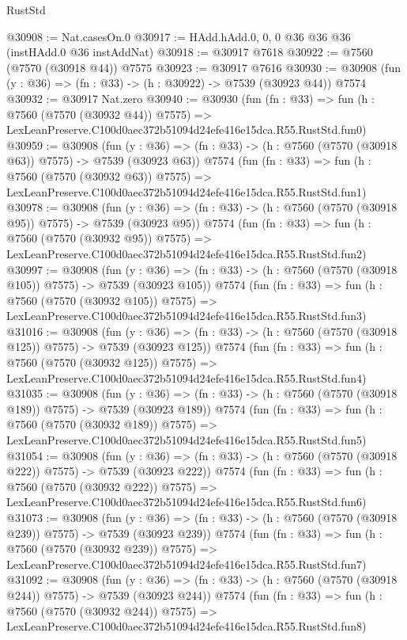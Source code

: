 \begin{lexlean}{RustStd}
\begin{coremodule}
@30908 := Nat.casesOn.{0}
@30917 := HAdd.hAdd.{0, 0, 0} @36 @36 @36 (instHAdd.{0} @36 instAddNat)
@30918 := @30917 @7618
@30922 := @7560 (@7570 (@30918 @44)) @7575
@30923 := @30917 @7616
@30930 := @30908 (fun (y : @36) => (fn : @33) -> (h : @30922) -> @7539 (@30923 @44)) @7574
@30932 := @30917 Nat.zero
@30940 := @30930
    (fun (fn : @33) =>
    fun (h : @7560 (@7570 (@30932 @44)) @7575) =>
    LexLeanPreserve.C100d0aec372b51094d24efe416e15dca.R55.RustStd.fun0)
@30959 := @30908
    (fun (y : @36) => (fn : @33) -> (h : @7560 (@7570 (@30918 @63)) @7575) -> @7539 (@30923 @63))
    @7574
    (fun (fn : @33) =>
    fun (h : @7560 (@7570 (@30932 @63)) @7575) =>
    LexLeanPreserve.C100d0aec372b51094d24efe416e15dca.R55.RustStd.fun1)
@30978 := @30908
    (fun (y : @36) => (fn : @33) -> (h : @7560 (@7570 (@30918 @95)) @7575) -> @7539 (@30923 @95))
    @7574
    (fun (fn : @33) =>
    fun (h : @7560 (@7570 (@30932 @95)) @7575) =>
    LexLeanPreserve.C100d0aec372b51094d24efe416e15dca.R55.RustStd.fun2)
@30997 := @30908
    (fun (y : @36) => (fn : @33) -> (h : @7560 (@7570 (@30918 @105)) @7575) -> @7539 (@30923 @105))
    @7574
    (fun (fn : @33) =>
    fun (h : @7560 (@7570 (@30932 @105)) @7575) =>
    LexLeanPreserve.C100d0aec372b51094d24efe416e15dca.R55.RustStd.fun3)
@31016 := @30908
    (fun (y : @36) => (fn : @33) -> (h : @7560 (@7570 (@30918 @125)) @7575) -> @7539 (@30923 @125))
    @7574
    (fun (fn : @33) =>
    fun (h : @7560 (@7570 (@30932 @125)) @7575) =>
    LexLeanPreserve.C100d0aec372b51094d24efe416e15dca.R55.RustStd.fun4)
@31035 := @30908
    (fun (y : @36) => (fn : @33) -> (h : @7560 (@7570 (@30918 @189)) @7575) -> @7539 (@30923 @189))
    @7574
    (fun (fn : @33) =>
    fun (h : @7560 (@7570 (@30932 @189)) @7575) =>
    LexLeanPreserve.C100d0aec372b51094d24efe416e15dca.R55.RustStd.fun5)
@31054 := @30908
    (fun (y : @36) => (fn : @33) -> (h : @7560 (@7570 (@30918 @222)) @7575) -> @7539 (@30923 @222))
    @7574
    (fun (fn : @33) =>
    fun (h : @7560 (@7570 (@30932 @222)) @7575) =>
    LexLeanPreserve.C100d0aec372b51094d24efe416e15dca.R55.RustStd.fun6)
@31073 := @30908
    (fun (y : @36) => (fn : @33) -> (h : @7560 (@7570 (@30918 @239)) @7575) -> @7539 (@30923 @239))
    @7574
    (fun (fn : @33) =>
    fun (h : @7560 (@7570 (@30932 @239)) @7575) =>
    LexLeanPreserve.C100d0aec372b51094d24efe416e15dca.R55.RustStd.fun7)
@31092 := @30908
    (fun (y : @36) => (fn : @33) -> (h : @7560 (@7570 (@30918 @244)) @7575) -> @7539 (@30923 @244))
    @7574
    (fun (fn : @33) =>
    fun (h : @7560 (@7570 (@30932 @244)) @7575) =>
    LexLeanPreserve.C100d0aec372b51094d24efe416e15dca.R55.RustStd.fun8)

\end{coremodule}
\end{lexlean}
